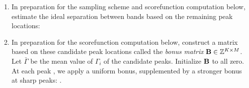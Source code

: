 \begin{enumerate}
\item In preparation for the sampling scheme and scorefunction computation below, estimate the ideal separation between bands based on the remaining peak locations: %

\item In preparation for the scorefunction computation below, construct a matrix based on these candidate peak locations called the \emph{bonus matrix} ${\mathbf{B}} \in \mathbb{Z}^{K \times M}$. Let $\bar{\Gamma}$ be the mean value of $\Gamma_i$ of the candidate peaks. Initialize ${\mathbf{B}}$ to all zero. At each peak , we apply a uniform bonus, supplemented by a stronger bonus at sharp peaks: .

\end{enumerate}




